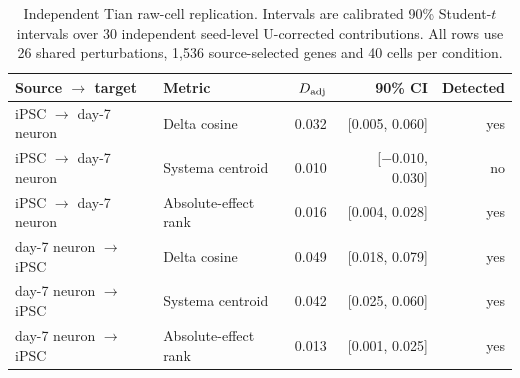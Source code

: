 \begin{table}[t]
\centering
\caption{Independent Tian raw-cell replication. Intervals are calibrated 90\% Student-$t$ intervals over 30 independent seed-level U-corrected contributions. All rows use 26 shared perturbations, 1,536 source-selected genes and 40 cells per condition.}
\label{tab:tian-rawcell}
\small
\begin{tabular}{llrrr}
\toprule
Source $\rightarrow$ target & Metric & $D_{\rm adj}$ & 90\% CI & Detected \\
\midrule
iPSC $\rightarrow$ day-7 neuron & Delta cosine & 0.032 & [0.005, 0.060] & yes \\
iPSC $\rightarrow$ day-7 neuron & Systema centroid & 0.010 & [$-0.010$, 0.030] & no \\
iPSC $\rightarrow$ day-7 neuron & Absolute-effect rank & 0.016 & [0.004, 0.028] & yes \\
day-7 neuron $\rightarrow$ iPSC & Delta cosine & 0.049 & [0.018, 0.079] & yes \\
day-7 neuron $\rightarrow$ iPSC & Systema centroid & 0.042 & [0.025, 0.060] & yes \\
day-7 neuron $\rightarrow$ iPSC & Absolute-effect rank & 0.013 & [0.001, 0.025] & yes \\
\bottomrule
\end{tabular}
\end{table}
